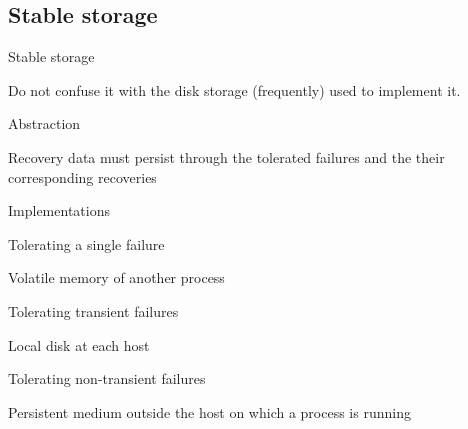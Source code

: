 \subsection{Stable storage}

\begin{frame}{Stable storage}
	
\BIL
\item Do not confuse it with the disk storage (frequently) used to implement it.
\item Abstraction
\BI
\item Recovery data must persist through the tolerated failures and the their corresponding recoveries
\EI
\item Implementations
	\BI
	\item Tolerating a single failure
		\BI
		\item Volatile memory of another process
		\EI
	\item Tolerating transient failures
		\BI
		\item Local disk at each host
		\EI
	\item Tolerating non-transient failures
		\BI
		\item Persistent medium outside the host on which a process is running
		\EI
	\EI
\EIL
\end{frame}

